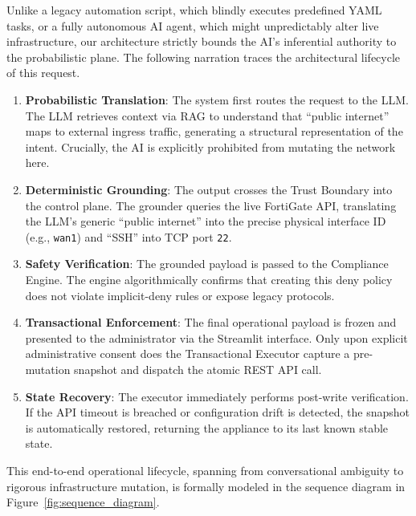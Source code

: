 Unlike a legacy automation script, which blindly executes predefined YAML tasks, or a fully autonomous AI agent, which might unpredictably alter live infrastructure, our architecture strictly bounds the AI's inferential authority to the probabilistic plane. The following narration traces the architectural lifecycle of this request.
\begin{enumerate}
    \item \textbf{Probabilistic Translation}: The system first routes the request to the LLM. The LLM retrieves context via RAG to understand that ``public internet'' maps to external ingress traffic, generating a structural representation of the intent. Crucially, the AI is explicitly prohibited from mutating the network here.
    \item \textbf{Deterministic Grounding}: The output crosses the Trust Boundary into the control plane. The grounder queries the live FortiGate API, translating the LLM's generic ``public internet'' into the precise physical interface ID (e.g., \texttt{wan1}) and ``SSH'' into TCP port \texttt{22}.
    \item \textbf{Safety Verification}: The grounded payload is passed to the Compliance Engine. The engine algorithmically confirms that creating this deny policy does not violate implicit-deny rules or expose legacy protocols.
    \item \textbf{Transactional Enforcement}: The final operational payload is frozen and presented to the administrator via the Streamlit interface. Only upon explicit administrative consent does the Transactional Executor capture a pre-mutation snapshot and dispatch the atomic REST API call.
    \item \textbf{State Recovery}: The executor immediately performs post-write verification. If the API timeout is breached or configuration drift is detected, the snapshot is automatically restored, returning the appliance to its last known stable state.
\end{enumerate}

This end-to-end operational lifecycle, spanning from conversational ambiguity to rigorous infrastructure mutation, is formally modeled in the sequence diagram in Figure~\ref{fig:sequence_diagram}.

